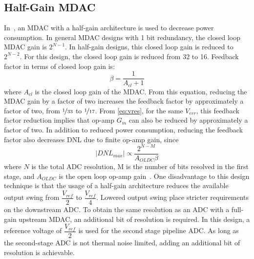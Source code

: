  \subsection{Half-Gain MDAC}
 In~\cite{5714725}, an MDAC with a half-gain architecture is used to decrease power consumption. In general MDAC designs with 1 bit redundancy, the closed loop MDAC gain is $2^{N-1}$. In half-gain designs, this closed loop gain is reduced to $2^{N-2}$. For this design, the closed loop gain is reduced from 32 to 16. Feedback factor in terms of closed loop gain is:
\begin{equation}
\label{eq:betacla}
\beta = \dfrac{1}{A_{cl}+1}
\end{equation}
where $A_{cl}$ is the closed loop gain of the MDAC. From this equation, reducing the MDAC gain by a factor of two increases the feedback factor by approximately a factor of two, from $\nicefrac{1}{33}$ to $\nicefrac{1}{17}$. From \ref{eq:vres}, for the same $V_{err}$, this feedback factor reduction implies that op-amp $G_m$ can also be reduced by approximately a factor of two. In addition to reduced power consumption, reducing the feedback factor also decreases DNL due to finite op-amp gain, since
\begin{equation}
\label{eq:dnlfinitegain}
|DNL_{max}|\propto \dfrac{2^{N-M}}{A_{OLDC}\beta}
\end{equation}
where $N$ is the total ADC resolution, M is the number of bits resolved in the first stage, and $A_{OLDC}$ is the open loop op-amp gain~\cite{5714725}. One disadvantage to this design technique is that the usage of a half-gain architecture reduces the available output swing from $\dfrac{V_{ref}}{2}$ to $\dfrac{V_{ref}}{4}$. Lowered output swing place stricter requirements on the downstream ADC. To obtain the same resolution as an ADC with a full-gain upstream MDAC, an additional bit of resolution is required. In this design, a reference voltage of $\dfrac{V_{ref}}{2}$ is used for the second stage pipeline ADC. As long as the second-stage ADC is not thermal noise limited, adding an additional bit of resolution is achievable.
